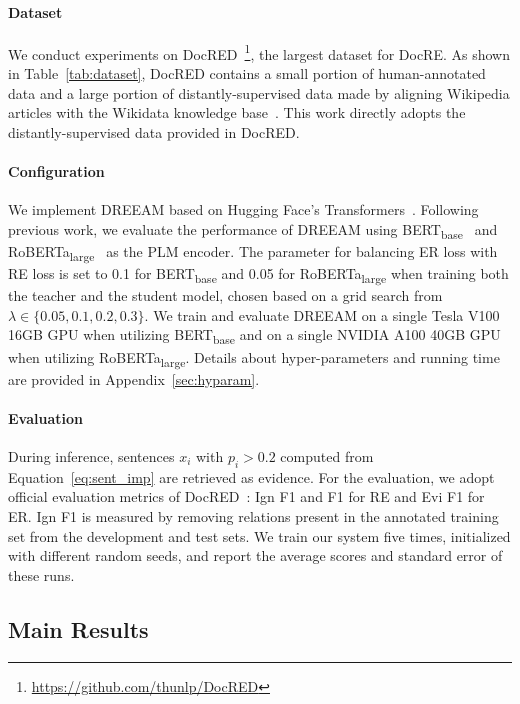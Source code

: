 \documentclass[11pt]{article}
\begin{document}
\paragraph{Dataset}  We conduct experiments on DocRED~\cite{yao-etal-2019-docred}\footnote{\url{https://github.com/thunlp/DocRED}}, the largest dataset for DocRE.
As shown in Table~\ref{tab:dataset}, DocRED contains a small portion of human-annotated data and a large portion of distantly-supervised data made by aligning Wikipedia articles with the Wikidata knowledge base~\cite{wikidata}.
This work directly adopts the distantly-supervised data provided in DocRED.

\paragraph{Configuration} We implement DREEAM based on Hugging Face's Transformers~\cite{wolf-etal-2020-transformers}.
Following previous work, we evaluate the performance of DREEAM using BERT\textsubscript{base}~\cite{devlin-etal-2019-bert} and RoBERTa\textsubscript{large}~\cite{Liu2019RoBERTaAR} as the PLM encoder.
The parameter for balancing ER loss with RE loss is set to 0.1 for BERT\textsubscript{base} and 0.05 for RoBERTa\textsubscript{large} when training both the teacher and the student model, chosen based on a grid search from $\lambda \in \{0.05, 0.1, 0.2, 0.3\}$.
We train and evaluate DREEAM on a single Tesla V100 16GB GPU when utilizing BERT\textsubscript{base} and on a single NVIDIA A100 40GB GPU when utilizing RoBERTa\textsubscript{large}.
Details about hyper-parameters and running time are provided in Appendix~\ref{sec:hyparam}.

\paragraph{Evaluation} During inference, sentences $x_i$ with $p_i > 0.2$ computed from Equation~\ref{eq:sent_imp} are retrieved as evidence.
For the evaluation, we adopt official evaluation metrics of DocRED~\cite{yao-etal-2019-docred}: Ign F1 and F1 for RE and Evi F1 for ER.
Ign F1 is measured by removing relations present in the annotated training set from the development and test sets.
We train our system five times, initialized with different random seeds, and report the average scores and standard error of these runs.

\subsection{Main Results}
\label{sec:main_results}
\end{document}
